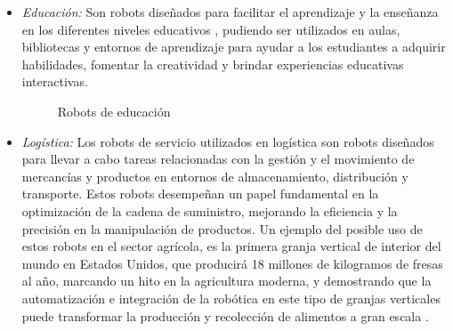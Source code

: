 \begin{itemize}
 
 \item \textit{Educación:} %
Son robots diseñados para facilitar el aprendizaje y la enseñanza en los diferentes niveles educativos%
, pudiendo ser utilizados en aulas, bibliotecas y entornos de aprendizaje para ayudar a los estudiantes a adquirir habilidades, fomentar la creatividad y brindar experiencias educativas interactivas.\\
 
 \begin{figure}[H]
    \begin{center}
      \subcapcentertrue
      \hspace{2mm}
    \end{center}
    \caption{Robots de educación}
    \label{fig:Robots de educación}
  \end{figure}
 
 \item \textit{Logística:} Los robots de servicio utilizados en logística son robots diseñados para llevar a cabo tareas relacionadas con la gestión y el movimiento de mercancías y productos en entornos de almacenamiento, distribución y transporte. Estos robots desempeñan un papel fundamental en la optimización de la cadena de suministro, mejorando la eficiencia y la precisión en la manipulación de productos. Un ejemplo del posible uso de estos robots en el sector agrícola, es la primera granja vertical de interior del mundo en Estados Unidos, que producirá 18 millones de kilogramos de fresas al año, marcando un hito en la agricultura moderna, y demostrando que la automatización e integración de la robótica en este tipo de granjas verticales puede transformar la producción y recolección de alimentos a gran escala \cite{EcoInventos24}.
 

\end{itemize}
